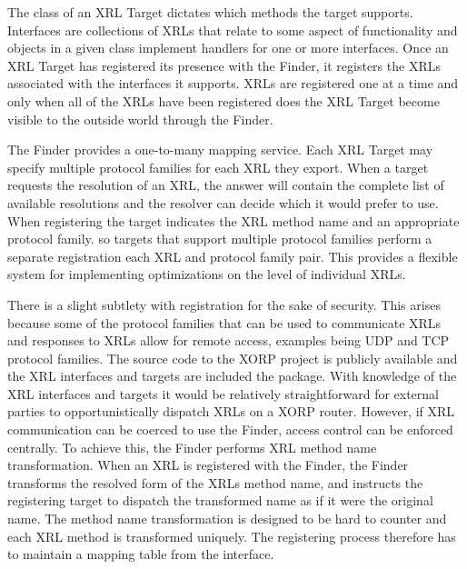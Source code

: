 \documentclass[11pt]{article}
\begin{document}
The class of an XRL Target dictates which methods the target supports.
Interfaces are collections of XRLs that relate to some aspect of
functionality and objects in a given class implement handlers for one
or more interfaces.  Once an XRL Target has registered its presence
with the Finder, it registers the XRLs associated with the interfaces
it supports. XRLs are registered one at a time and only when all of
the XRLs have been registered does the XRL Target become visible to
the outside world through the Finder.

The Finder provides a one-to-many mapping service.  Each XRL Target
may specify multiple protocol families for each XRL they export. When
a target requests the resolution of an XRL, the answer will contain
the complete list of available resolutions and the resolver can decide
which it would prefer to use.  When registering the target indicates
the XRL method name and an appropriate protocol family.  so targets
that support multiple protocol families perform a separate
registration each XRL and protocol family pair.  This provides a
flexible system for implementing optimizations on the level of
individual XRLs.


There is a slight subtlety with registration for the sake of security.
This arises because some of the protocol families that can be used to
communicate XRLs and responses to XRLs allow for remote access,
examples being UDP and TCP protocol families.  The source code to the
XORP project is publicly available and the XRL interfaces and targets
are included the package.  With knowledge of the XRL interfaces and
targets it would be relatively straightforward for external parties to
opportunistically dispatch XRLs on a XORP router.  However, if XRL
communication can be coerced to use the Finder, access control can be
enforced centrally.  To achieve this, the Finder performs XRL method
name transformation.  When an XRL is registered with the Finder, the
Finder transforms the resolved form of the XRLs method name, and
instructs the registering target to dispatch the transformed name as
if it were the original name.  The method name transformation is
designed to be hard to counter and each XRL method is transformed
uniquely.  The registering process therefore has to maintain a mapping
table from the interface.
\end{document}
